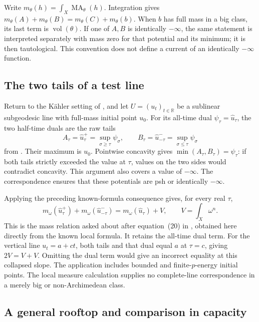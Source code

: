 Write $m_\theta(h)=\int_X\operatorname{MA}_\theta(h)$.
Integration gives
$m_\theta(A)+m_\theta(B)=m_\theta(C)+m_\theta(b)$.
When $b$ has full mass in a big class, its last term is
$\operatorname{vol}(\theta)$. If one of $A,B$ is identically
$-\infty$, the same statement is interpreted separately with
mass zero for that potential and its minimum; it is then tautological.
This convention does not define a current of an identically
$-\infty$ function.

\subsection{The two tails of a test line}

Return to the K\"ahler setting of
, and let $U=(u_t)_{t\in\mathbb R}$
be a sublinear subgeodesic line with full-mass initial point $u_0$.
For its all-time dual $\psi_\tau=\widehat u_\tau$, the two
half-time duals are the raw tails
\[
 A_\tau=\widehat u^+_\tau=\sup_{\sigma\geq\tau}\psi_\sigma,
 \qquad
 B_\tau=\widehat u^-_{-\tau}=\sup_{\sigma\leq\tau}\psi_\sigma
\]
from \cite[Lemma~3.4]{DarvasMcCleerey26Lines}.
Their maximum is $u_0$. Pointwise concavity gives
$\min(A_\tau,B_\tau)=\psi_\tau$: if both tails strictly
exceeded the value at $\tau$, values on the two sides would
contradict concavity. This argument also covers a value of
$-\infty$. The correspondence ensures that these potentials
are psh or identically $-\infty$.

Applying the preceding known-formula consequence gives, for every
real $\tau$,
\[
\tag{65.57}\label{eq:rf-line-tail-mass}
 m_\omega(\widehat u^+_\tau)+m_\omega(\widehat u^-_{-\tau})
 =m_\omega(\widehat u_\tau)+V,
 \qquad V=\int_X\omega^n.
\]
This is the mass relation asked about after equation~(20) in
\cite{DarvasMcCleerey26Lines}, obtained here directly from the
known local formula. It retains the all-time dual term.
For the vertical line $u_t=a+ct$, both tails and that dual equal
$a$ at $\tau=c$, giving $2V=V+V$. Omitting the dual term
would give an incorrect equality at this collapsed slope.
The application includes bounded and finite-$p$-energy initial
points. The local measure calculation supplies no complete-line
correspondence in a merely big or non-Archimedean class.

\subsection{A general rooftop and comparison in capacity}

